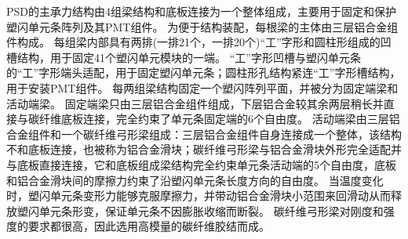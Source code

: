 PSD的主承力结构由4组梁结构和底板连接为一个整体组成，主要用于固定和保护塑闪单元条阵列及其PMT组件。
为便于结构装配，每根梁的主体由三层铝合金组件构成。
每组梁内部具有两排(一排21个，一排20个)“工”字形和圆柱形组成的凹槽结构，用于固定41个塑闪单元模块的一端。
“工”字形凹槽与塑闪单元条的“工”字形端头适配，用于固定塑闪单元条；圆柱形孔结构紧连“工”字形槽结构，用于安装PMT组件。
每两组梁结构固定一个塑闪阵列平面，并被分为固定端梁和活动端梁。
固定端梁只由三层铝合金组件组成，下层铝合金较其余两层稍长并直接与碳纤维底板连接，完全约束了单元条固定端的6个自由度。
活动端梁由三层铝合金组件和一个碳纤维弓形梁组成：三层铝合金组件自身连接成一个整体，该结构不和底板连接，也被称为铝合金滑块；碳纤维弓形梁与铝合金滑块外形完全适配并与底板直接连接，它和底板组成梁结构完全约束单元条活动端的5个自由度，底板和铝合金滑块间的摩擦力约束了沿塑闪单元条长度方向的自由度。
当温度变化时，塑闪单元条变形力能够克服摩擦力，并带动铝合金滑块小范围来回滑动从而释放塑闪单元条形变，保证单元条不因膨胀收缩而断裂。
碳纤维弓形梁对刚度和强度的要求都很高，因此选用高模量的碳纤维胶结而成。



